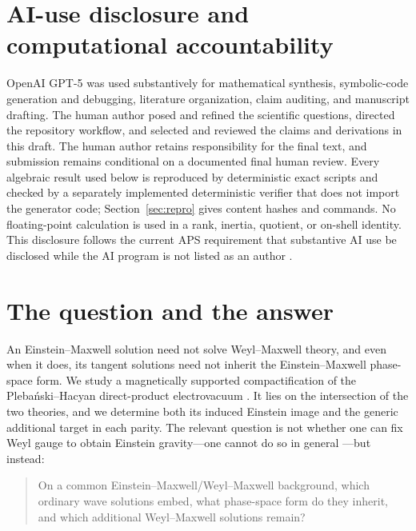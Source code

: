 \documentclass[11pt]{article}
\theoremstyle{remark}
\begin{document}
\section*{AI-use disclosure and computational accountability}
OpenAI GPT-5 was used substantively for mathematical synthesis, symbolic-code
generation and debugging, literature organization, claim auditing, and
manuscript drafting. The human author posed and refined the scientific
questions, directed the repository workflow, and selected and reviewed the
claims and derivations in this draft. The human author retains responsibility
for the final text, and submission remains conditional on a documented final
human review. Every algebraic result used below is reproduced by deterministic
exact scripts and checked by a separately implemented deterministic verifier
that does not import the generator code; Section~\ref{sec:repro} gives content
hashes and commands. No floating-point calculation is used in a
rank, inertia, quotient, or on-shell identity. This disclosure follows the
current APS requirement that substantive AI use be disclosed while the AI
program is not listed as an author \cite{APSAI}.

\tableofcontents

\section{The question and the answer}\label{sec:intro}

An Einstein--Maxwell solution need not solve Weyl--Maxwell theory, and even
when it does, its tangent solutions need not inherit the Einstein--Maxwell
phase-space form. We study a magnetically supported compactification of the
Pleba\'nski--Hacyan direct-product electrovacuum
\cite{PlebanskiHacyan,KrtousEtAl,Ortaggio}. It lies on the intersection of
the two theories, and we determine both its induced Einstein image and the
generic additional target in each parity. The relevant question is not whether one can fix
Weyl gauge to obtain Einstein gravity---one cannot do so in general
\cite{Bach,Maldacena,DeserJoungWaldron}---but instead:
\begin{quote}
On a common Einstein--Maxwell/Weyl--Maxwell background, which ordinary wave
solutions embed, what phase-space form do they inherit, and which additional
Weyl--Maxwell solutions remain?
\end{quote}
\end{document}
